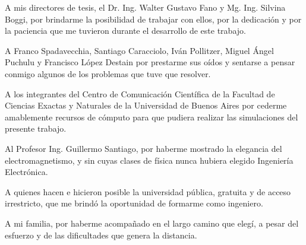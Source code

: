A mis directores de tesis, el Dr. Ing. Walter Gustavo Fano y Mg. Ing. Silvina Boggi, por brindarme la posibilidad de trabajar con ellos, por la dedicación y por la paciencia que me tuvieron durante el desarrollo de este trabajo.

A Franco Spadavecchia, Santiago Caracciolo, Iván Pollitzer, Miguel Ángel Puchulu y Francisco López Destain por prestarme sus oídos y sentarse a pensar conmigo algunos de los problemas que tuve que resolver.

A los integrantes del Centro de Comunicación Científica de la Facultad de Ciencias Exactas y Naturales de la Universidad de Buenos Aires por cederme amablemente recursos de cómputo para que pudiera realizar las simulaciones del presente trabajo.

Al Profesor Ing. Guillermo Santiago, por haberme mostrado la elegancia del electromagnetismo, y sin cuyas clases de física nunca hubiera elegido Ingeniería Electrónica.

A quienes hacen e hicieron posible la universidad pública, gratuita y de acceso irrestricto, que me brindó la oportunidad de formarme como ingeniero.

A mi familia, por haberme acompañado en el largo camino que elegí, a pesar del esfuerzo y de las dificultades que genera la distancia.